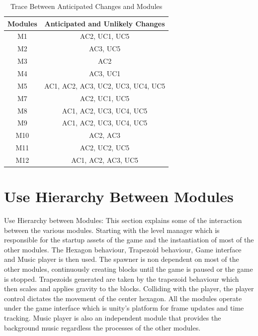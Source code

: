 \documentclass[12pt, titlepage]{article}
\begin{document}
\begin{center}
\begin{table}[H]
\centering
\begin{tabular}{ |c| c| }\hline

 \textbf{Modules}    & \textbf{Anticipated and Unlikely Changes}  \\ \hline
 M1   & AC2, UC1, UC5   \\ \hline
 M2   & AC3, UC5  \\ \hline
 M3   & AC2  \\ \hline
 M4   & AC3, UC1  \\ \hline
 M5   & AC1, AC2, AC3, UC2, UC3, UC4, UC5  \\ \hline
 M7   & AC2, UC1, UC5  \\ \hline
 M8   & AC1, AC2, UC3, UC4, UC5  \\ \hline
 M9   & AC1, AC2, UC3, UC4, UC5  \\ \hline
 M10  & AC2, AC3  \\ \hline
 M11  & AC2, UC2, UC5  \\ \hline
 M12  & AC1, AC2, AC3, UC5  \\ \hline
 
\end{tabular}
\caption{Trace Between Anticipated Changes and Modules}
\end{table}
\end{center}




\section{Use Hierarchy Between Modules}
Use Hierarchy between Modules: This section explains some of the interaction between the various modules. Starting with the level manager which is responsible for the startup assets of the game and the instantiation of most of the other modules. The Hexagon behaviour, Trapezoid behaviour, Game interface and Music player is then used. The spawner is non dependent on most of the other modules, continuously creating blocks until the game is paused or the game is stopped. Trapezoids generated are taken by the trapezoid behaviour which then scales and applies gravity to the blocks. Colliding with the player, the player control dictates the movement of the center hexagon. All the modules operate under the game interface which is unity's platform for frame updates and time tracking. Music player is also an independent module that provides the background music regardless the processes of the other modules.
\end{document}
